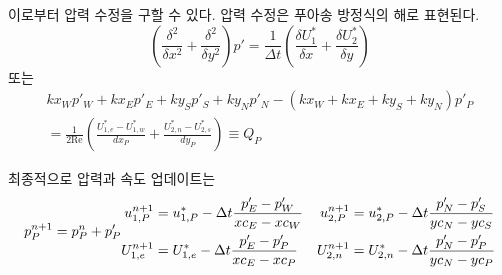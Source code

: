 \documentclass[a4paper, 10pt]{article}
\renewcommand{\Re}{\mathrm{Re}}
\begin{document}
이로부터 압력 수정을 구할 수 있다. 압력 수정은 푸아송 방정식의 해로 표현된다.
\begin{equation}
    \left( \frac{\delta^2}{\delta x^2} + \frac{\delta^2}{\delta y^2} \right) p'
    = \frac{1}{\Delta t} \left( \frac{\delta U_1^*}{\delta x} + \frac{\delta U_2^*}{\delta y} \right)
\end{equation}
또는
\begin{multline}
    kx_W p'_W + kx_E p'_E + ky_S p'_S + ky_N p'_N - (kx_W + kx_E + ky_S + ky_N) p'_P \\
    = \frac{1}{2\Re} \left( \frac{U_{1, e}^* - U_{1, w}^*}{dx_P} + \frac{U_{2, n}^* - U_{2, s}^*}{dy_P} \right)
    \equiv Q_P
\end{multline}

최종적으로 압력과 속도 업데이트는
\begin{subequations}
    \begin{equation}
        p_P^{n+1} = p_P^n + p'_P
    \end{equation} \vspace{-25pt}
    \begin{align}
        u_{1, P}^{n+1} &= u_{1, P}^* - \Delta t \frac{p'_E - p'_W}{xc_E - xc_W} &
        u_{2, P}^{n+1} &= u_{2, P}^* - \Delta t \frac{p'_N - p'_S}{yc_N - yc_S} \\
        U_{1, e}^{n+1} &= U_{1, e}^* - \Delta t \frac{p'_E - p'_P}{xc_E - xc_P} &
        U_{2, n}^{n+1} &= U_{2, n}^* - \Delta t \frac{p'_N - p'_P}{yc_N - yc_P}
    \end{align}
\end{subequations}
\end{document}
